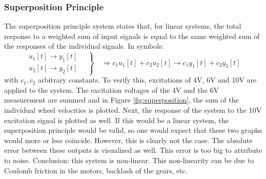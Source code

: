 \documentclass[a4paper,kul]{kulakarticle} %
\begin{document}
\subsubsection{Superposition Principle}
The superposition principle system states that, for linear systems, the total response to a weighted sum of input signals is equal to the same weighted sum of the responses of the individual signals. In symbols:
\begin{equation}
\left.
\begin{split}
	u_1[t] \rightarrow y_1[t]\\
	u_2[t] \rightarrow y_2[t]
\end{split}
\quad
\right\}
\quad \Longrightarrow c_1 u_1[t] + c_2 u_2[t] \rightarrow c_1 y_1[t] + c_2 y_2[t]
\end{equation}
with $c_1, c_2$ arbitrary constants. To verify this, excitations of 4V, 6V and 10V are applied to the system. The excitation voltages of the 4V and the 6V measurement are summed and in Figure \ref{fig:superposition}, the sum of the individual wheel velocities is plotted. Next, the response of the system to the 10V excitation signal is plotted as well. If this would be a linear system, the superposition principle would be valid, so one would expect that these two graphs would more or less coincide. However, this is clearly not the case. The absolute error between these outputs is visualized as well. This error is too big to attribute to noise. Conclusion: this system is non-linear. This non-linearity can be due to Coulomb friction in the motors, backlash of the gears, etc.
\end{document}
